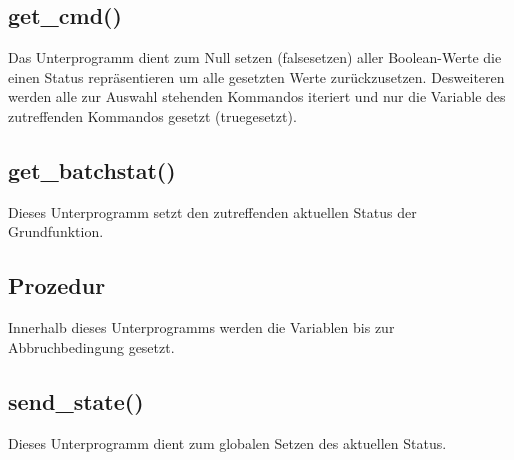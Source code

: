 	\subsection{get\_cmd()}
	Das Unterprogramm dient zum Null setzen (\glqq false\grqq \space setzen) aller Boolean-Werte die einen Status repräsentieren um alle gesetzten Werte zurückzusetzen. Desweiteren werden alle zur Auswahl stehenden Kommandos iteriert und nur die Variable des zutreffenden Kommandos gesetzt (\glqq true\grqq \space gesetzt).

	

	\subsection{get\_batchstat()}
	Dieses Unterprogramm setzt den zutreffenden aktuellen Status der Grundfunktion.
	
	

	\subsection{Prozedur}
	Innerhalb dieses Unterprogramms werden die Variablen bis zur Abbruchbedingung gesetzt.
	
	

	\subsection{send\_state()}
	Dieses Unterprogramm dient zum globalen Setzen des aktuellen Status.
	
	
		
